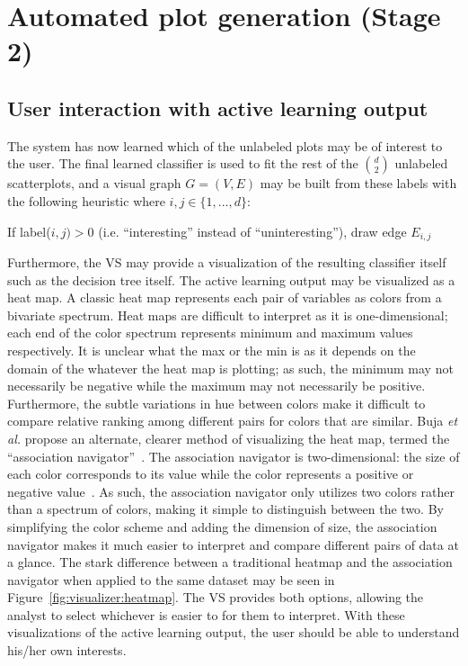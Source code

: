 \section{Automated plot generation (Stage 2)}
\label{sec:visualizer:plotgeneration}

\subsection{User interaction with active learning output}
\label{sec:visualizer:plotgeneration:user}

The system has now learned which of the unlabeled plots 
may be of interest to the user. The final learned classifier is used to fit the 
rest of the $d \choose 2$ unlabeled scatterplots, and a visual graph $G=(V,E)$ 
may be built from these labels with the following heuristic where $i,j \in 
\{1,...,d\}$:

\begin{algorithm}
	If label($i,j)>0$ (i.e. ``interesting'' instead of ``uninteresting''), draw 
	edge $E_{i,j}$
\end{algorithm}

Furthermore, the VS may provide a visualization of the resulting classifier 
itself such as the decision tree itself. The active learning output may be 
visualized as a heat map. A 
classic heat map represents each pair of variables as colors from a bivariate 
spectrum. Heat maps are difficult to interpret as it is one-dimensional; each 
end of the color spectrum represents minimum and maximum values respectively. 
It is unclear what the max or the min is as it depends on the domain of the 
whatever the heat map is plotting; as such, the minimum may not necessarily be 
negative while the maximum may not necessarily be positive. Furthermore, the 
subtle variations in hue between colors make it difficult to compare relative 
ranking among different pairs for colors that are similar. Buja \textit{et al.} 
propose an alternate, clearer method of visualizing the heat map, termed the 
``association navigator''~\cite{buja2016}. The association navigator is 
two-dimensional: the size of each color corresponds to its value while the 
color 
represents a positive or negative value~\cite{buja2016}. As such, the 
association navigator only utilizes two colors rather than a spectrum of 
colors, making it simple to distinguish between the two. By simplifying the 
color scheme and adding the dimension of size, the association navigator makes 
it much easier to interpret and compare different pairs of data at a glance. 
The stark difference between a traditional heatmap and the association 
navigator when applied to the same dataset may be seen in 
Figure~\ref{fig:visualizer:heatmap}. The VS provides both options, allowing the 
analyst to select whichever is easier to for them to interpret. 
With these visualizations of the active learning output, the user should be 
able to understand his/her own interests. 

